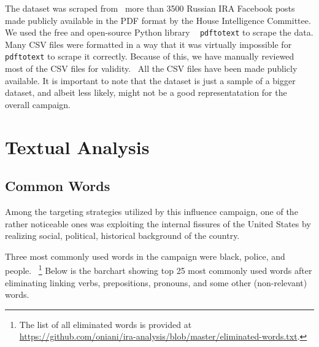 \documentclass[12pt]{article}
\theoremstyle{definition}
\begin{document}
The dataset was scraped from~\cite{ira2016data} more than 3500 Russian IRA
Facebook posts made publicly available in the PDF format by the House
Intelligence Committee. We used the free and open-source Python library
~\cite{pdftotext} \texttt{pdftotext} to scrape the data. Many CSV files were
formatted in a way that it was virtually impossible for \texttt{pdftotext} to
scrape it correctly. Because of this, we have manually reviewed most of the
CSV files for validity.~\cite{ira2016csvdata} All the CSV files have been made
publicly available. It is important to note that the dataset is just a sample
of a bigger dataset, and albeit less likely, might not be a good representatation
for the overall campaign.


\section*{\centering Textual Analysis}


\subsection*{\centering Common Words}

Among the targeting strategies utilized by this influence campaign, one of the
rather noticeable ones was exploiting the internal fissures of the United States
by realizing social, political, historical background of the country.

\bigskip

Three most commonly used words in the campaign were black, police, and people.
~\footnote{The list of all eliminated words is provided at\\
\url{https://github.com/oniani/ira-analysis/blob/master/eliminated-words.txt}.}
Below is the barchart showing top 25 most commonly used words after eliminating
linking verbs, prepositions, pronouns, and some other (non-relevant) words.
\end{document}
